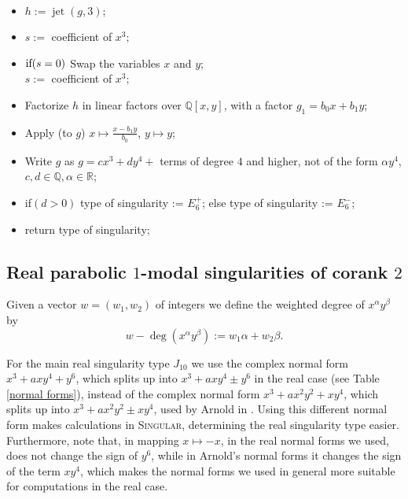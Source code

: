 \documentclass{amsproc}
\DeclareMathOperator{\jt}{jet}
\begin{document}
\begin{itemize}
\item $h:= \jt(g,3);$
\item $s:=$ coefficient of ${x^3};$
\item $\textnormal{if}(s=0)$\newline
\phantom{}\quad Swap the variables $x$ and $y$;\\
\phantom{}\quad $s:=$ coefficient of ${x^3}$;
\item Factorize $h$ in linear factors over $\mathbb Q[x,y]$, with a factor
$g_1=b_0x+b_1y$;
\item Apply (to $g$) $x\mapsto \frac{x-b_1y}{b_0}$, $y\mapsto y$;
\item Write $g$ as $g=cx^3+d y^4+$ terms of degree $4$
and higher, not of the form $\alpha y^4$, $c,d\in\mathbb Q, \alpha\in\mathbb R$;
\item \textnormal{if}$(d>0)$\newline
\phantom{}\quad type of singularity := $E_6^+$;\newline
\phantom{} else\newline
\phantom{}\quad type of singularity := $E_6^-$;
\item return type of singularity;
\end{itemize}

\subsection{Real parabolic $1$-modal singularities of corank $2$}
Given a vector $w=(w_1,w_2)$ of integers we define the weighted degree of $x^\alpha y^\beta$ by \[w-\deg(x^\alpha y^\beta):=w_1\alpha+w_2\beta.\] 


For the main real singularity type $J_{10}$ we use the complex normal form $x^3+axy^4+ y^6$, which splits up into $x^3+axy^4\pm y^6$ in the real case (see Table \ref{normal forms}),  instead of the complex normal form $x^3+ax^2y^2+xy^4$, which splits up into $x^3+ax^2y^2\pm xy^4$, used by Arnold in \cite{AVG1985}. Using this different normal form makes calculations in \textsc{Singular}, determining the real singularity type easier. Furthermore, note that, in mapping $x\mapsto -x$, in the real normal forms we used, does not change the sign of $y^6$, while in Arnold's normal forms it changes the sign of the term $xy^4$, which makes the normal forms we used in general more suitable for computations in  the real case.
\end{document}
